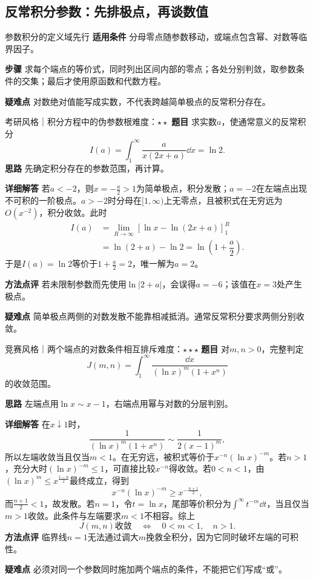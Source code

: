 \subsection{反常积分参数：先排极点，再谈数值}\label{ci:parameterdomain}
\begin{method}{参数积分的定义域先行}
\textbf{适用条件} 分母零点随参数移动，或端点包含幂、对数等临界因子。\par
\textbf{步骤} 求每个端点的等价式，同时列出区间内部的零点；各处分别判敛，取参数条件的交集；最后才使用原函数和代数方程。\par
\textbf{疑难点} 对数绝对值能写成实数，不代表跨越简单极点的反常积分存在。
\end{method}
\begin{example}{考研风格｜积分方程中的伪参数根}{难度：$\star\star$}\label{ci:ex:parameterpole}
\textbf{题目} 求实数$a$，使通常意义的反常积分
\[
 I(a)=\int_1^\infty\dfrac{a}{x(2x+a)}\dd x=\ln2.
\]
\textbf{思路} 先确定积分存在的参数范围，再计算。\par
\textbf{详细解答} 若$a<-2$，则$x=-\frac{a}{2}>1$为简单极点，积分发散；$a=-2$在左端点出现不可积的一阶极点。$a>-2$时分母在$[1,\infty)$上无零点，且被积式在无穷远为$O(x^{-2})$，积分收敛。此时
\begin{align*}
 I(a)&=\lim_{R\to\infty}
 \left[\ln x-\ln(2x+a)\right]_1^R\\
 &=\ln(2+a)-\ln2=\ln\left(1+\dfrac a2\right).
\end{align*}
于是$I(a)=\ln2$等价于$1+\frac{a}{2}=2$，唯一解为$a=2$。\par
\textbf{方法点评} 若未限制参数而先使用$\ln|2+a|$，会误得$a=-6$；该值在$x=3$处产生极点。\par
\textbf{疑难点} 简单极点两侧的对数发散不能靠相减抵消。通常反常积分要求两侧分别收敛。
\end{example}
\begin{example}{竞赛风格｜两个端点的对数条件相互排斥}{难度：$\star\star\star$}\label{ci:ex:logphase}
\textbf{题目} 对$m,n>0$，完整判定
\[
 J(m,n)=\int_1^\infty\dfrac{\dd x}{(\ln x)^m(1+x^n)}
\]
的收敛范围。\par
\textbf{思路} 左端点用$\ln x\sim x-1$，右端点用幂与对数的分层判别。\par
\textbf{详细解答} 在$x\downarrow1$时，
\[
 \dfrac1{(\ln x)^m(1+x^n)}\sim\dfrac1{2(x-1)^m},
\]
所以左端收敛当且仅当$m<1$。在无穷远，被积式等价于$x^{-n}(\ln x)^{-m}$。若$n>1$，充分大时$(\ln x)^{-m}\le1$，可直接比较$x^{-n}$得收敛。若$0<n<1$，由$(\ln x)^m\le x^{\frac{1-n}{2}}$最终成立，得到
\[
 x^{-n}(\ln x)^{-m}\ge x^{-\frac{n+1}{2}},
\]
而$\frac{n+1}{2}<1$，故发散。若$n=1$，令$t=\ln x$，尾部等价积分为$\int^\infty t^{-m}\dd t$，当且仅当$m>1$收敛。此条件与左端要求$m<1$不相容。综上
\[
 J(m,n)\text{收敛}\quad\Longleftrightarrow\quad 0<m<1,\quad n>1.
\]
\textbf{方法点评} 临界线$n=1$无法通过调大$m$挽救全积分，因为它同时破坏左端的可积性。\par
\textbf{疑难点} 必须对同一个参数同时施加两个端点的条件，不能把它们写成“或”。
\end{example}

